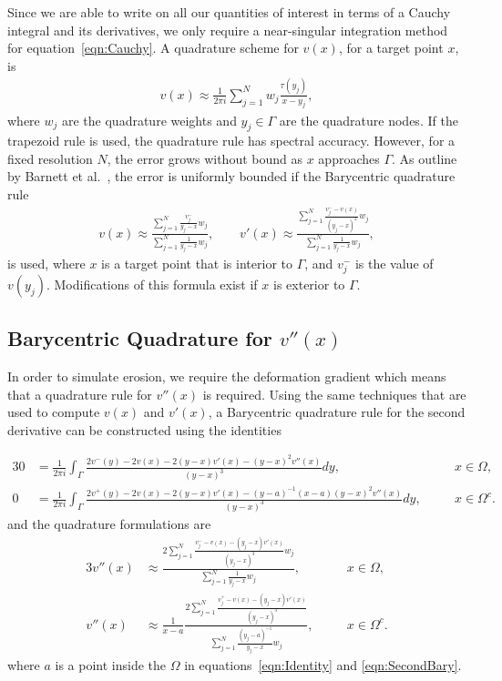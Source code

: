 \documentclass[preprint, 10pt]{elsarticle}
\begin{document}
Since we are able to write on all our quantities of interest in terms of
a Cauchy integral and its derivatives, we only require a near-singular
integration method for equation~\eqref{eqn:Cauchy}.  A quadrature scheme
for $v(x)$, for a target point $x$, is
\begin{align}
  v(x) \approx \frac{1}{2\pi i} \sum_{j=1}^N 
    w_j \frac{\tau(y_j)}{x - y_j},
\end{align}
where $w_j$ are the quadrature weights and $y_j \in \Gamma$ are the
quadrature nodes.  If the trapezoid rule is used, the quadrature rule
has spectral accuracy.  However, for a fixed resolution $N$, the error
grows without bound as $x$ approaches $\Gamma$.  As outline by Barnett
et al.~\cite{bar-wu-vee2015}, the error is uniformly bounded if the
Barycentric quadrature rule
\begin{align}
  v(x) \approx \frac{\sum\limits_{j=1}^N \frac{v_j^-}{y_j-x}w_j}
    {\sum\limits_{j=1}^N \frac{1}{y_j-x}w_j},  \qquad
  v'(x) \approx \frac{\sum\limits_{j=1}^N \frac{v_j^- - v(x)}{(y_j - x)^2}w_j}
    {\sum\limits_{j=1}^N \frac{1}{y_j-x}w_j}, 
\end{align}
is used, where $x$ is a target point that is interior to $\Gamma$,
and $v_j^-$ is the value of $v(y_j)$.  Modifications of this formula
exist if $x$ is exterior to $\Gamma$.

\subsection{Barycentric Quadrature for $v''(x)$}
In order to simulate erosion, we require the deformation gradient which
means that a quadrature rule for $v''(x)$ is required.  Using the same
techniques that are used to compute $v(x)$ and $v'(x)$, a Barycentric
quadrature rule for the second derivative can be constructed using the
identities
{\color{red}
\begin{alignat}{3}
  0 &= \frac{1}{2\pi i}\int_{\Gamma} 
    \frac{2v^-({ y})-2v(x)-2(y-x)v'(x)-(y-x)^2v''(x)}{(y-x)^3} dy, &&x \in \Omega, \\
  0 &= \frac{1}{2\pi i}\int_{\Gamma}
    \frac{2v^+(y)-2v(x)-2(y-x)v'(x)-(y-a)^{-1}(x-a)(y-x)^2 v''(x)}
    {(y-x)^3} dy, \quad &&x \in \Omega^c.  \label{eqn:Identity}
\end{alignat}
and the quadrature formulations are
\begin{alignat}{3}
  v''(x) &\approx
    \frac{2\sum\limits_{j=1}^N \frac{v_j^- -v(x)-(y_j-x)v'(x)}{(y_j-x)^3}w_j}
    {\sum\limits_{j=1}^N \frac{1}{y_j-x}w_j}, &&x \in \Omega, \\
  v''(x) &\approx \frac{1}{x-a}\frac{2\sum\limits_{j=1}^N
    \frac{v_j^+ -v(x)-(y_j-x)v'(x)}{(y_j-x)^3}}{\sum\limits_{j=1}^N \frac{(y_j-a)^{-1}}{y_j-x}w_j}
    , \quad &&x \in \Omega^c.  \label{eqn:SecondBary}
\end{alignat}
where $a$ is a point inside the $\Omega$ in equations~\eqref{eqn:Identity} and \eqref{eqn:SecondBary}.

}
\end{document}

